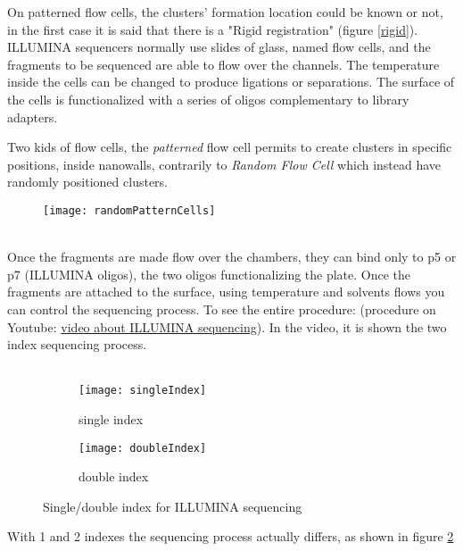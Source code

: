 On patterned flow cells, the clusters' formation location could be known or not, in the first case it is said that there is a "Rigid registration" (figure \ref{rigid}).\\


ILLUMINA sequencers normally use slides of glass, named flow cells, and the fragments to be sequenced are able to flow over the channels. The temperature inside the cells can be changed to produce ligations or separations. The surface of the cells is functionalized with a series of oligos complementary to library adapters.

Two kids of flow cells, the \textit{patterned} flow cell permits to create clusters in specific positions, inside nanowalls, contrarily to \textit{Random Flow Cell} which instead have randomly positioned clusters.
\begin{figure}[h]
\caption{}
\centering
\texttt{[image: randomPatternCells]}
\label{}
\end{figure}
\\

Once the fragments are made flow over the chambers, they can bind only to p5 or p7 (ILLUMINA oligos), the two oligos functionalizing the plate. Once the fragments are attached to the surface, using temperature and solvents flows you can control the sequencing process. To see the entire procedure:
(procedure on Youtube: \href{https://www.youtube.com/watch?v=womKfikWlxM}{video about ILLUMINA sequencing}). In the video, it is shown the two index sequencing process.
\\
\\


\begin{figure}[H]
    \centering

    \begin{subfigure}[b]{0.39\textwidth}
        \centering
        \texttt{[image: singleIndex]}
        \caption{single index}
    \end{subfigure}
    \hfill
    \begin{subfigure}[b]{0.60\textwidth}
        \centering
        \texttt{[image: doubleIndex]}
        \caption{double index}
    \end{subfigure}
    \caption{Single/double index for ILLUMINA sequencing}
    \label{singDoubInd}
\end{figure}

With 1 and 2 indexes the sequencing process actually differs, as shown in figure \ref{singDoubInd}


